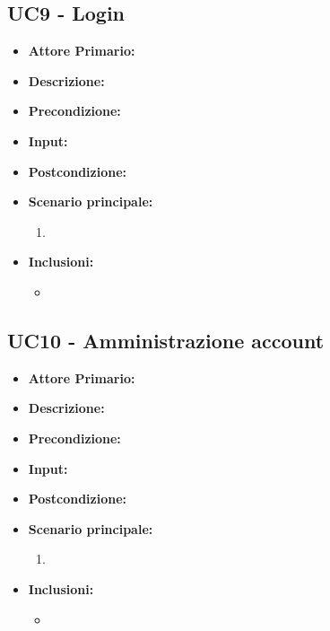 \subsection{UC9 - Login}
\label{UC9}
\begin{itemize}
    \item \textbf{Attore Primario:} 
    \item \textbf{Descrizione:}
    \item \textbf{Precondizione:}
    \item \textbf{Input:}
    \item \textbf{Postcondizione:}
    \item \textbf{Scenario principale:}
    \begin{enumerate}
        \item 
    \end{enumerate}
    \item \textbf{Inclusioni:}
    \begin{itemize}
        \item
    \end{itemize}
\end{itemize}

\subsection{UC10 - Amministrazione account}
\label{UC10}
\begin{itemize}
    \item \textbf{Attore Primario:} 
    \item \textbf{Descrizione:}
    \item \textbf{Precondizione:}
    \item \textbf{Input:}
    \item \textbf{Postcondizione:}
    \item \textbf{Scenario principale:}
    \begin{enumerate}
        \item 
    \end{enumerate}
    \item \textbf{Inclusioni:}
    \begin{itemize}
        \item
    \end{itemize}
\end{itemize}

